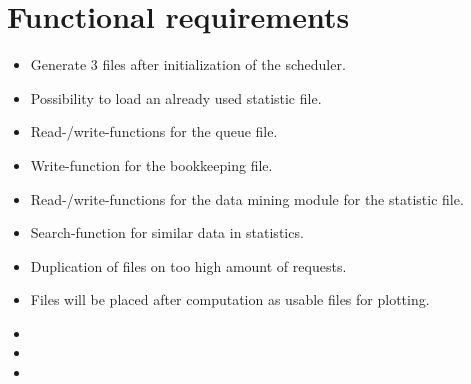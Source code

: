 {


\setcounter{func}{10}
\renewcommand{\labelitemi}{
	\ifnum \value{func}<10$/F 0\arabic{func} /$\addtocounter{func}{10}
	\else $/F \arabic{func} /$\addtocounter{func}{10}\fi
	}

\section{Functional requirements} 
	\begin{itemize}
		\item Generate 3 files after initialization of the scheduler.
		\item Possibility to load an already used statistic file.
		\item Read-/write-functions for the queue file.
		\item Write-function for the bookkeeping file.
		\item Read-/write-functions for the data mining module for the statistic file.
		\item Search-function for similar data in statistics.
		\item Duplication of files on too high amount of requests.
		\item Files will be placed after computation as usable files for plotting.
		\item 
		\item
		\item 
	\end{itemize}
}